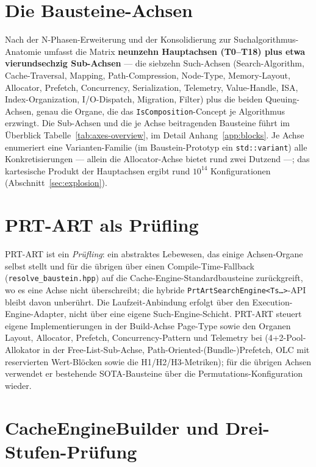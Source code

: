 \section{Die Bausteine-Achsen}\label{sec:axes}

Nach der N-Phasen-Erweiterung und der Konsolidierung zur Suchalgorithmus-Anatomie umfasst die
Matrix \textbf{neunzehn Hauptachsen (T0--T18) plus etwa vierundsechzig Sub-Achsen} --- die siebzehn
Such-Achsen (Search-Algorithm, Cache-Traversal, Mapping, Path-Compression, Node-Type, Memory-Layout,
Allocator, Prefetch, Concurrency, Serialization, Telemetry, Value-Handle, ISA, Index-Organization,
I/O-Dispatch, Migration, Filter) plus die beiden Queuing-Achsen, genau die Organe, die das
\texttt{IsComposition}-Concept je Algorithmus erzwingt. Die Sub-Achsen und die je Achse beitragenden
Bausteine führt im Überblick Tabelle~\ref{tab:axes-overview}, im Detail Anhang~\ref{app:blocks}. Je
Achse enumeriert eine Varianten-Familie (im Baustein-Prototyp ein \texttt{std::variant}) alle
Konkretisierungen --- allein die Allocator-Achse bietet rund zwei Dutzend ---; das kartesische
Produkt der Hauptachsen ergibt rund $10^{14}$ Konfigurationen (Abschnitt~\ref{sec:explosion}).

\section{PRT-ART als Prüfling}\label{sec:prt-art}

PRT-ART ist ein \emph{Prüfling}: ein abstraktes Lebewesen, das einige Achsen-Organe selbst stellt
und für die übrigen über einen Compile-Time-Fallback (\texttt{resolve\_baustein.hpp}) auf die
Cache-Engine-Standardbausteine zurückgreift, wo es eine Achse nicht überschreibt; die hybride
\texttt{PrtArtSearchEngine<Ts\ldots>}-API bleibt davon unberührt. Die Laufzeit-Anbindung erfolgt
über den Execution-Engine-Adapter, nicht über eine eigene Such-Engine-Schicht. PRT-ART steuert
eigene Implementierungen in der Build-Achse Page-Type sowie den Organen Layout, Allocator, Prefetch,
Concurrency-Pattern und Telemetry bei (4+2-Pool-Allokator in der Free-List-Sub-Achse, Path-Oriented-(Bundle-)Prefetch, OLC mit reservierten
Wert-Blöcken sowie die H1/H2/H3-Metriken); für die übrigen Achsen verwendet er bestehende
SOTA-Bausteine über die Permutations-Konfiguration wieder.

\section{CacheEngineBuilder und Drei-Stufen-Prüfung}\label{sec:builder}

